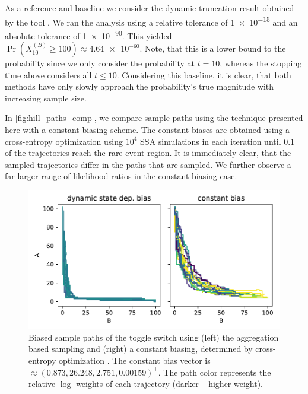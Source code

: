 As a reference and baseline we consider the dynamic truncation result obtained by the  tool \parencite{lapin2011shave}.
We ran the analysis using a relative tolerance of \num{1e-15} and an absolute tolerance of \num{1e-90}.
This yielded \(\Pr(X_{10}^{(B)} \geq 100) \approx \num{4.64e-60}\).
Note, that this is a lower bound to the probability since we only consider the probability at $t=10$, whereas the stopping time above considers all $t\leq 10$.
Considering this baseline, it is clear, that both methods have only slowly approach the probability's true magnitude with increasing sample size.

In \autoref{fig:hill_paths_comp}, we compare sample paths using the technique presented here with a constant biasing scheme.
The constant biases are obtained using a cross-entropy optimization using $10^4$ \ac{SSA} simulations in each iteration until $0.1$ of the trajectories reach the rare event region.
It is immediately clear, that the sampled trajectories differ in the paths that are sampled.
We further observe a far larger range of likelihood ratios in the constant biasing case.
\begin{figure}[htb]
    \centering
    \includegraphics[scale=.6]{gfx/hill_paths_comp.pdf}
    \caption[Comparison of biased sample paths]{\label{fig:hill_paths_comp}Biased sample paths of the toggle switch using (left) the aggregation based sampling and (right) a constant biasing, determined by cross-entropy optimization \parencite{daigle2011automated}. The constant bias vector is $\approx (0.873, 26.248, 2.751, 0.00159)^{\top}$. The path color represents the relative $\log$-weights of each trajectory (darker -- higher weight).}
\end{figure}

